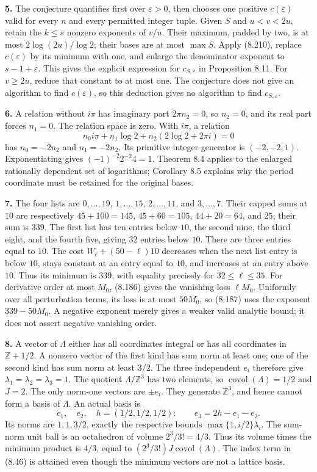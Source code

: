 \documentclass[
  11pt,
  a4paper,
]{article}
\begin{document}
\textbf{5.} The conjecture quantifies first over \(\varepsilon>0\), then
chooses one positive \(c(\varepsilon)\) valid for every \(n\) and every
permitted integer tuple. Given \(S\) and \(u<v<2u\), retain the
\(k\le s\) nonzero exponents of \(v/u\). Their maximum, padded by two,
is at most \(2\log(2u)/\log2\); their bases are at most \(\max S\).
Apply (8.210), replace \(c(\varepsilon)\) by its minimum with one, and
enlarge the denominator exponent to \(s-1+\varepsilon\). This gives the
explicit expression for \(c_{S,\varepsilon}\) in Proposition 8.11. For
\(v\ge2u\), reduce that constant to at most one. The conjecture does not
give an algorithm to find \(c(\varepsilon)\), so this deduction gives no
algorithm to find \(c_{S,\varepsilon}\).

\textbf{6.} A relation without \(i\pi\) has imaginary part
\(2\pi n_2=0\), so \(n_2=0\), and its real part forces \(n_1=0\). The
relation space is zero. With \(i\pi\), a relation \[
n_0i\pi+n_1\log2+n_2(2\log2+2\pi i)=0
\] has \(n_0=-2n_2\) and \(n_1=-2n_2\). Its primitive integer generator
is \((-2,-2,1)\). Exponentiating gives \((-1)^{-2}2^{-2}4=1\). Theorem
8.4 applies to the enlarged rationally dependent set of logarithms;
Corollary 8.5 explains why the period coordinate must be retained for
the original bases.

\textbf{7.} The four lists are \(0,\ldots,19\), \(1,\ldots,15\),
\(2,\ldots,11\), and \(3,\ldots,7\). Their capped sums at \(10\) are
respectively \(45+100=145\), \(45+60=105\), \(44+20=64\), and \(25\);
their sum is \(339\). The first list has ten entries below \(10\), the
second nine, the third eight, and the fourth five, giving \(32\) entries
below \(10\). There are three entries equal to \(10\). The cost
\(W_\ell+(50-\ell)10\) decreases when the next list entry is below
\(10\), stays constant at an entry equal to \(10\), and increases at an
entry above \(10\). Thus its minimum is \(339\), with equality precisely
for \(32\le\ell\le35\). For derivative order at most \(M_0\), (8.186)
gives the vanishing loss \(\ell M_0\). Uniformly over all perturbation
terms, its loss is at most \(50M_0\), so (8.187) uses the exponent
\(339-50M_0\). A negative exponent merely gives a weaker valid analytic
bound; it does not assert negative vanishing order.

\textbf{8.} A vector of \(\Lambda\) either has all coordinates integral
or has all coordinates in \(\mathbb Z+1/2\). A nonzero vector of the
first kind has sum norm at least one; one of the second kind has sum
norm at least \(3/2\). The three independent \(e_i\) therefore give
\(\lambda_1=\lambda_2=\lambda_3=1\). The quotient
\(\Lambda/\mathbb Z^3\) has two elements, so
\(\operatorname{covol}(\Lambda)=1/2\) and \(J=2\). The only norm-one
vectors are \(\pm e_i\). They generate \(\mathbb Z^3\), and hence cannot
form a basis of \(\Lambda\). An actual basis is \[
e_1,\quad e_2,\quad h=(1/2,1/2,1/2):
\qquad e_3=2h-e_1-e_2.
\] Its norms are \(1,1,3/2\), exactly the respective bounds
\(\max\{1,i/2\}\lambda_i\). The sum-norm unit ball is an octahedron of
volume \(2^3/3!=4/3\). Thus its volume times the minimum product is
\(4/3\), equal to \((2^3/3!)J\operatorname{covol}(\Lambda)\). The index
term in (8.46) is attained even though the minimum vectors are not a
lattice basis.
\end{document}
